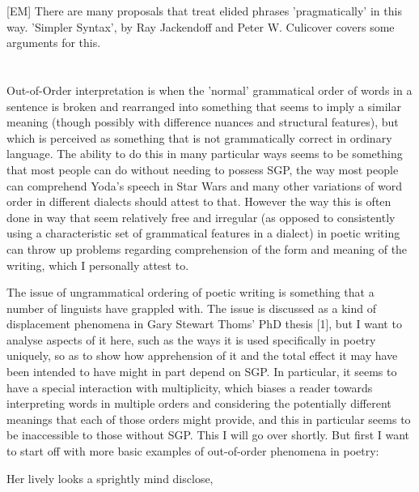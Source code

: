\documentclass[]{article}
\begin{document}
[EM] There are many proposals that treat elided phrases 'pragmatically' in this way. 'Simpler Syntax', by Ray Jackendoff and Peter W. Culicover covers some arguments for this.





\section{}





Out-of-Order interpretation is when the 'normal' grammatical order of words in a sentence is broken and rearranged into something that seems to imply a similar meaning (though possibly with difference nuances and structural features), but which is perceived as something that is not grammatically correct in ordinary language. The ability to do this in many particular ways seems to be something that most people can do without needing to possess SGP, the way most people can comprehend Yoda's speech in Star Wars and many other variations of word order in different dialects should attest to that. However the way this is often done in way that seem relatively free and irregular (as opposed to consistently using a characteristic set of grammatical features in a dialect) in poetic writing can throw up problems regarding comprehension of the form and meaning of the writing, which I personally attest to.



The issue of ungrammatical ordering of poetic writing is something that a number of linguists have grappled with. The issue is discussed as a kind of displacement phenomena in Gary Stewart Thoms' PhD thesis [1], but I want to analyse aspects of it here, such as the ways it is used specifically in poetry uniquely, so as to show how apprehension of it and the total effect it may have been intended to have might in part depend on SGP. In particular, it seems to have a special interaction with multiplicity, which biases a reader towards interpreting words in multiple orders and considering the potentially different meanings that each of those orders might provide, and this in particular seems to be inaccessible to those without SGP. This I will go over shortly. But first I want to start off with more basic examples of out-of-order phenomena in poetry:





Her lively looks a sprightly mind disclose,
\end{document}

